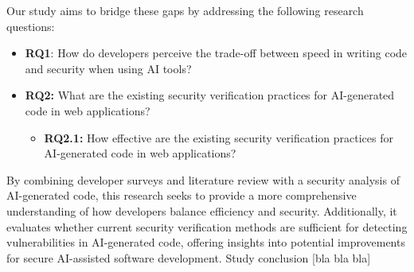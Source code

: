 Our study aims to bridge these gaps by addressing the following research questions:
\begin{itemize}
	\item \textbf{RQ1}: How do developers perceive the trade-off between speed in writing code and security when using AI tools?
	\item \textbf{RQ2:} What are the existing security verification practices for AI-generated code in web applications?
  	\begin{itemize}
    	\item \textbf{RQ2.1:} How effective are the existing security verification practices for AI-generated code in web applications?
  	\end{itemize}
\end{itemize}

By combining developer surveys and literature review with a security analysis of AI-generated code, this research seeks to provide a more comprehensive understanding of how developers balance efficiency and security. Additionally, it evaluates whether current security verification methods are sufficient for detecting vulnerabilities in AI-generated code, offering insights into potential improvements for secure AI-assisted software development.
Study conclusion [bla bla bla]